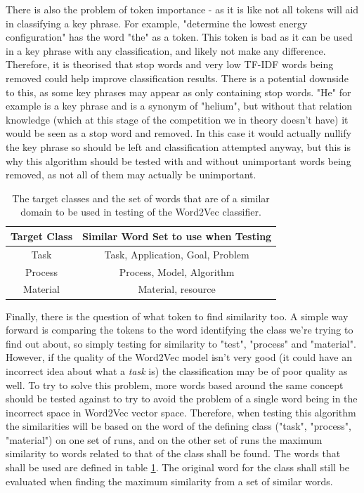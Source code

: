 There is also the problem of token importance - as it is like not all tokens will aid in classifying a key phrase. For example, "determine the lowest energy configuration" has the word "the" as a token. This token is bad as it can be used in a key phrase with any classification, and likely not make any difference. Therefore, it is theorised that stop words and very low TF-IDF words being removed could help improve classification results. There is a potential downside to this, as some key phrases may appear as only containing stop words. "He" for example is a key phrase and is a synonym of "helium", but without that relation knowledge (which at this stage of the competition we in theory doesn't have) it would be seen as a stop word and removed. In this case it would actually nullify the key phrase so should be left and classification attempted anyway, but this is why this algorithm should be tested with and without unimportant words being removed, as not all of them may actually be unimportant.
\begin{table}
	\centering
	\begin{tabular}{ c | c }
		\textbf{Target Class} & \textbf{Similar Word Set to use when Testing} \\
		\hline
		Task & Task, Application, Goal, Problem \\
		 \hline
		Process & Process, Model, Algorithm\\
		 \hline
		Material & Material, resource \\
	\end{tabular}
	\caption[Word2Vec Classification Target Words]{The target classes and the set of words that are of a similar domain to be used in testing of the Word2Vec classifier.}
	\label{table:w2vclasswords}
\end{table}

Finally, there is the question of what token to find similarity too. A simple way forward is comparing the tokens to the word identifying the class we're trying to find out about, so simply testing for similarity to "test", "process" and "material". However, if the quality of the Word2Vec model isn't very good (it could have an incorrect idea about what a \textit{task} is) the classification may be of poor quality as well. To try to solve this problem, more words based around the same concept should be tested against to try to avoid the problem of a single word being in the incorrect space in Word2Vec vector space. Therefore, when testing this algorithm the similarities will be based on the word of the defining class ("task", "process", "material") on one set of runs, and on the other set of runs the maximum similarity to words related to that of the class shall be found. The words that shall be used are defined in table \ref{table:w2vclasswords}. The original word for the class shall still be evaluated when finding the maximum similarity from a set of similar words.

